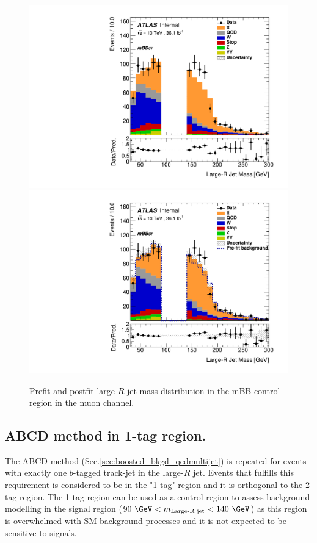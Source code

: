 \begin{figure}[!htbp]
\begin{center}
\includegraphics[scale=0.33]{./figures/boosted/CR_QCDFloat_Mu/QCDFloat_mBBcr_Mu_Prefit} 
\includegraphics[scale=0.33]{./figures/boosted/CR_QCDFloat_Mu/QCDFloat_mBBcr_Mu_Postfit}\\
\caption{Prefit and postfit large-$R$ jet mass distribution in the mBB control region in the muon channel.}
\label{fig:boostedabcd_mbbcr_muon_fit}
\end{center}
\end{figure}


\FloatBarrier
%
%
\subsection{ABCD method in 1-tag region.}
\label{app:boosted_abcd_1tag}
The ABCD method (Sec.\ref{sec:boosted_bkgd_qcdmultijet}) is repeated for events with exactly one $b$-tagged track-jet
in the large-$R$ jet. Events that fulfills this requirement is considered to be in the "1-tag" region and it is orthogonal 
to the 2-tag region. The 1-tag region can be used as a control region to assess background modelling in the signal region
($90~\GeV < m_\text{Large-R jet} < 140~\GeV$) as this region is overwhelmed with SM background processes and it is not expected to
be sensitive to signals. 

